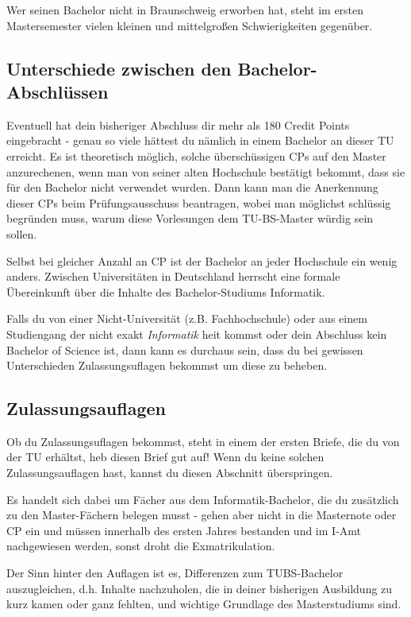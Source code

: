 \begin{multicols}{2}
	Wer seinen Bachelor nicht in Braunschweig erworben hat, steht im ersten Mastersemester vielen kleinen und mittelgroßen Schwierigkeiten gegenüber.

	\subsection{Unterschiede zwischen den Bachelor-Abschlüssen}
		Eventuell hat dein bisheriger Abschluss dir mehr als 180 Credit Points eingebracht - genau so viele hättest du nämlich in einem Bachelor an dieser TU erreicht. Es ist theoretisch möglich, solche überschüssigen CPs auf den Master anzurechenen, wenn man von seiner alten Hochschule bestätigt bekommt, dass sie für den Bachelor nicht verwendet wurden. Dann kann man die Anerkennung dieser CPs beim Prüfungsausschuss beantragen, wobei man möglichst schlüssig begründen muss, warum diese Vorlesungen dem TU-BS-Master würdig sein sollen.

		Selbst bei gleicher Anzahl an CP ist der Bachelor an jeder Hochschule ein wenig anders. Zwischen Universitäten in Deutschland herrscht eine formale Übereinkunft über die Inhalte des Bachelor-Studiums Informatik. 

		Falls du von einer Nicht-Universität (z.B. Fachhochschule) oder aus einem Studiengang der nicht exakt \emph{Informatik} heit kommst oder dein Abschluss kein Bachelor of Science ist, dann kann es durchaus sein, dass du bei gewissen Unterschieden Zulassungsuflagen bekommst um diese zu beheben.

	\subsection{Zulassungsauflagen}
	\label{auflagen}
	Ob du Zulassungsuflagen bekommst, steht in einem der ersten Briefe, die du von der TU erhältst, heb diesen Brief gut auf! Wenn du keine solchen Zulassungsauflagen hast, kannst du diesen Abschnitt überspringen.

	Es handelt sich dabei um Fächer aus dem Informatik-Bachelor, die du zusätzlich zu den Master-Fächern belegen musst - gehen aber nicht in die Masternote oder CP ein und müssen innerhalb des ersten Jahres bestanden und im I-Amt nachgewiesen werden, sonst droht die Exmatrikulation.

	Der Sinn hinter den Auflagen ist es, Differenzen zum TUBS-Bachelor auszugleichen, d.h. Inhalte nachzuholen, die in deiner bisherigen Ausbildung zu kurz kamen oder ganz fehlten, und wichtige Grundlage des Masterstudiums sind.


\end{multicols}
